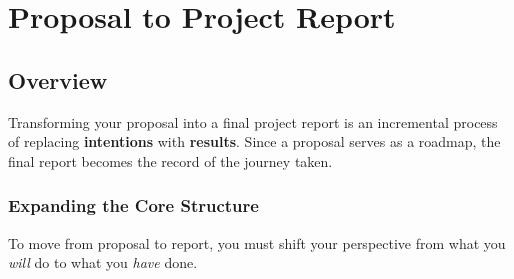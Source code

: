 \documentclass{report}
\begin{document}

\newpage
\thispagestyle{empty}
\tableofcontents

\chapter{Proposal to Project Report}

\section{Overview}

Transforming your proposal into a final project report is an incremental process
of replacing \textbf{intentions} with \textbf{results}. Since a proposal serves as
a roadmap, the final report becomes the record of the journey taken.

\subsection{Expanding the Core Structure}

To move from proposal to report, you must shift your perspective from what you
\textit{will} do to what you \textit{have} done.
\end{document}
